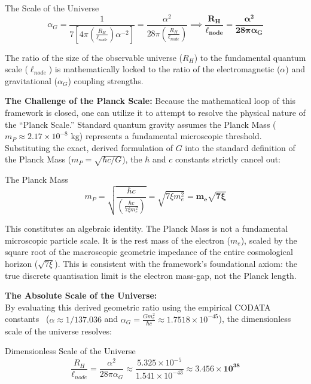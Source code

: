 \begin{resultbox}{The Scale of the Universe}
\begin{equation}
\alpha_{G}=\frac{1}{7\left[4\pi\left(\frac{R_{H}}{\ell_{node}}\right)\alpha^{-2}\right]}=\frac{\alpha^{2}}{28\pi\left(\frac{R_{H}}{\ell_{node}}\right)}\implies \mathbf{\frac{R_{H}}{\ell_{node}}=\frac{\alpha^{2}}{28\pi\alpha_{G}}}
\end{equation}
\end{resultbox}

The ratio of the size of the observable universe ($R_{H}$) to the fundamental quantum scale ($\ell_{node}$) is mathematically locked to the ratio of the electromagnetic ($\alpha$) and gravitational ($\alpha_{G}$) coupling strengths.

\textbf{The Challenge of the Planck Scale:} Because the mathematical loop of this framework is closed, one can utilize it to attempt to resolve the physical nature of the ``Planck Scale.'' Standard quantum gravity assumes the Planck Mass ($m_{P}\approx2.17\times10^{-8}\text{ kg}$) represents a fundamental microscopic threshold. Substituting the exact, derived formulation of $G$ into the standard definition of the Planck Mass ($m_{P}=\sqrt{\hbar c/G}$), the $\hbar$ and $c$ constants strictly cancel out:

\begin{resultbox}{The Planck Mass}
\begin{equation}
m_{P}=\sqrt{\frac{\hbar c}{\left(\frac{\hbar c}{7\xi m_{e}^{2}}\right)}}=\sqrt{7\xi m_{e}^{2}}=\mathbf{m_{e}\sqrt{7\xi}}
\end{equation}
\end{resultbox}

This constitutes an algebraic identity. The Planck Mass is not a fundamental microscopic particle scale. It is the rest mass of the electron ($m_{e}$), scaled by the square root of the macroscopic geometric impedance of the entire cosmological horizon ($\sqrt{7\xi}$). This is consistent with the framework's foundational axiom: the true discrete quantisation limit is the electron mass-gap, not the Planck length.

\vspace{1em}
\noindent\textbf{The Absolute Scale of the Universe:} \\
By evaluating this derived geometric ratio using the empirical CODATA constants~\cite{codata2018} ($\alpha \approx 1/137.036$ and $\alpha_G = \frac{G m_e^2}{\hbar c} \approx 1.7518 \times 10^{-45}$), the dimensionless scale of the universe resolves:
\begin{resultbox}{Dimensionless Scale of the Universe}
\begin{equation}
\frac{R_H}{\ell_{node}} = \frac{\alpha^2}{28\pi\alpha_G} \approx \frac{5.325 \times 10^{-5}}{1.541 \times 10^{-43}} \approx \mathbf{3.456 \times 10^{38}}
\end{equation}
\end{resultbox}

